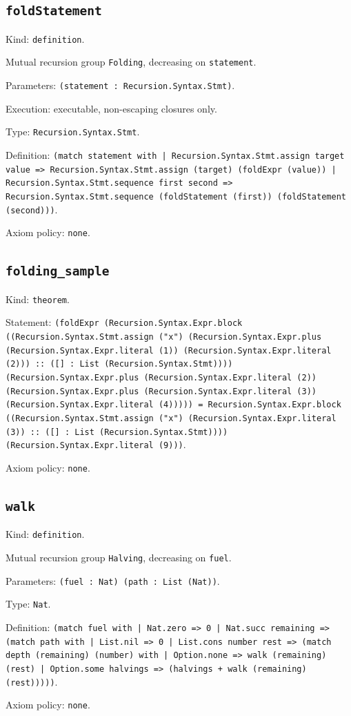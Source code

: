 \documentclass[11pt]{article}
\begin{document}
\subsection*{\texttt{foldStatement}}
\noindent Kind: \texttt{definition}.\par
\noindent Mutual recursion group \texttt{Folding}, decreasing on \texttt{statement}.\par
\noindent Parameters: \texttt{(statement : Recursion.Syntax.Stmt)}.\par
\noindent Execution: executable, non-escaping closures only.\par
\noindent Type: \texttt{Recursion.Syntax.Stmt}.\par
\noindent Definition: \texttt{(match statement with | Recursion.Syntax.Stmt.assign target value => Recursion.Syntax.Stmt.assign (target) (foldExpr (value)) | Recursion.Syntax.Stmt.sequence first second => Recursion.Syntax.Stmt.sequence (foldStatement (first)) (foldStatement (second)))}.\par
\noindent Axiom policy: \texttt{none}.\par
\subsection*{\texttt{folding\_sample}}
\noindent Kind: \texttt{theorem}.\par
\noindent Statement: \texttt{(foldExpr (Recursion.Syntax.Expr.block ((Recursion.Syntax.Stmt.assign ("x") (Recursion.Syntax.Expr.plus (Recursion.Syntax.Expr.literal (1)) (Recursion.Syntax.Expr.literal (2))) :: ([] : List (Recursion.Syntax.Stmt)))) (Recursion.Syntax.Expr.plus (Recursion.Syntax.Expr.literal (2)) (Recursion.Syntax.Expr.plus (Recursion.Syntax.Expr.literal (3)) (Recursion.Syntax.Expr.literal (4))))) = Recursion.Syntax.Expr.block ((Recursion.Syntax.Stmt.assign ("x") (Recursion.Syntax.Expr.literal (3)) :: ([] : List (Recursion.Syntax.Stmt)))) (Recursion.Syntax.Expr.literal (9)))}.\par
\noindent Axiom policy: \texttt{none}.\par
\subsection*{\texttt{walk}}
\noindent Kind: \texttt{definition}.\par
\noindent Mutual recursion group \texttt{Halving}, decreasing on \texttt{fuel}.\par
\noindent Parameters: \texttt{(fuel : Nat) (path : List (Nat))}.\par
\noindent Type: \texttt{Nat}.\par
\noindent Definition: \texttt{(match fuel with | Nat.zero => 0 | Nat.succ remaining => (match path with | List.nil => 0 | List.cons number rest => (match depth (remaining) (number) with | Option.none => walk (remaining) (rest) | Option.some halvings => (halvings + walk (remaining) (rest)))))}.\par
\noindent Axiom policy: \texttt{none}.\par
\end{document}
